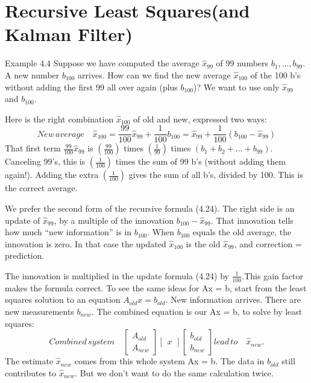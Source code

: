 \section{Recursive Least Squares(and Kalman Filter)}
Example 4.4 \; Suppose we have computed the average $\hat{x}_99$ of 99 numbers $b_1,...,b_{99}$. A
new number $b_{100}$ arrives. How can we find the new average $\hat{x}_{100}$ of the 100 b's without
adding the first 99 all over again (plus $b_{100}$)? We want to use only $\hat{x}_99$ and $b_{100}$.

Here is the right combination $\hat{x}_{100}$ of old and new, expressed two ways:
\begin{equation}
New\, average \quad
\hat{x}_{100}=\frac{99}{100}\hat{x}_{99}+\frac{1}{100}b_{100}=\hat{x}_{99}+\frac{1}{100}(b_{100}-\hat{x}_{99})
\end{equation} 
That first term $\frac{99}{100}\hat{x}_{99}$ is $(\frac{99}{100})$ times $(\frac{1}{99})$ times $(b_1+b_2+...+b_{99})$. Canceling 99's, this is $(\frac{1}{100})$ times the sum of 99 b's (without adding them again!). Adding the extra $(\frac{1}{100})$ gives the sum of all b's, divided by 100. This is the correct average.

We prefer the second form of the recursive formula (4.24). The right side is an update
of $\hat{x}_{99}$, by a multiple of the innovation $b_{100}-\hat{x}_{99}$. That innovation tells how much “new information” is in $b_{100}$. When $b_{100}$ equals the old average, the innovation is zero. In that case the updated $\hat{x}_{100}$ is the old $\hat{x}_{99}$, and correction = prediction.

The innovation is multiplied in the update formula (4.24) by $\frac{1}{100}$.This gain factor makes the formula correct. To see the same ideas for Ax = b, start from the least squares solution to an equation $A_{old}x=b_{old}$. New information arrives. There are new measurements $b_{new}$. The combined equation is our Ax = b, to solve by least squares:
\begin{equation}
Combined \,system \quad
\begin{bmatrix}
A_{old} \\ A_{new}
\end{bmatrix}
\begin{bmatrix}
x
\end{bmatrix}
\begin{bmatrix}
b_{old} \\ b_{new}
\end{bmatrix}
lead\,to \quad \hat{x}_{new}.
\end{equation}  
The estimate $\hat{x}_{new}$ comes from this whole system Ax = b. The data in $b_{old}$ still contributes to $\hat{x}_{new}$. But we don't want to do the same calculation twice.

